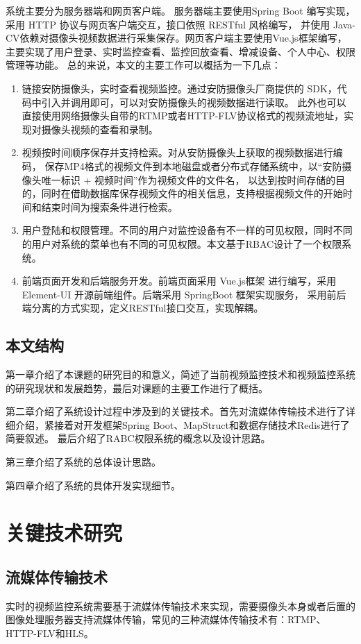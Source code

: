 系统主要分为服务器端和网页客户端。
服务器端主要使用Spring Boot 编写实现，采用 HTTP 协议与网页客户端交互，接口依照 RESTful 风格编写，
并使用 Java-CV依赖对摄像头视频数据进行采集保存。网页客户端主要使用Vue.js框架编写，主要实现了用户登录、实时监控查看、监控回放查看、增减设备、个人中心、权限管理等功能。
总的来说，本文的主要工作可以概括为一下几点：
\begin{enumerate}
    \item 链接安防摄像头，实时查看视频监控。通过安防摄像头厂商提供的 SDK，代码中引入并调用即可，可以对安防摄像头的视频数据进行读取。
    此外也可以直接使用网络摄像头自带的RTMP或者HTTP-FLV协议格式的视频流地址，实现对摄像头视频的查看和录制。
    \item 视频按时间顺序保存并支持检索。对从安防摄像头上获取的视频数据进行编码，
    保存MP4格式的视频文件到本地磁盘或者分布式存储系统中，以“安防摄像头唯一标识 + 视频时间”作为视频文件的文件名，
    以达到按时间存储的目的，同时在借助数据库保存视频文件的相关信息，支持根据视频文件的开始时间和结束时间为搜索条件进行检索。
    \item 用户登陆和权限管理。不同的用户对监控设备有不一样的可见权限，同时不同的用户对系统的菜单也有不同的可见权限。本文基于RBAC设计了一个权限系统。
    \item 前端页面开发和后端服务开发。前端页面采用 Vue.js框架 进行编写，采用 Element-UI 开源前端组件。后端采用  SpringBoot 框架实现服务，
    采用前后端分离的方式实现，定义RESTful接口交互，实现解耦。
\end{enumerate}


\section{本文结构}
第一章介绍了本课题的研究目的和意义，简述了当前视频监控技术和视频监控系统的研究现状和发展趋势，最后对课题的主要工作进行了概括。

第二章介绍了系统设计过程中涉及到的关键技术。首先对流媒体传输技术进行了详细介绍，紧接着对开发框架Spring Boot、MapStruct和数据存储技术Redis进行了简要叙述。
最后介绍了RABC权限系统的概念以及设计思路。

第三章介绍了系统的总体设计思路。

第四章介绍了系统的具体开发实现细节。

\chapter{关键技术研究}
\section{流媒体传输技术}
实时的视频监控系统需要基于流媒体传输技术来实现，需要摄像头本身或者后置的图像处理服务器支持流媒体传输，常见的三种流媒体传输技术有：RTMP、HTTP-FLV和HLS。

